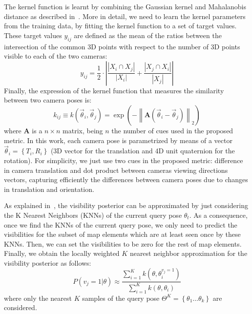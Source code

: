 \documentclass[conference]{IEEEtran}
\begin{document}
The kernel function is learnt by combining the Gaussian kernel and Mahalanobis distance as described in~\cite{Alcantarilla11icra}. More in detail, we need to learn the kernel parameters from the training data, by fitting the kernel function to a set of target values. These target values $y_{ij}$ are defined as the mean of the ratios between the intersection of the common 3D points with respect to the number of 3D points visible to each of the two cameras:
%
\begin{equation}\label{eq:similarity_weighted}
y_{ij} = \frac{1}{2}\cdot \left| \frac{\left|X_i \cap X_j \right|}{\left|X_i\right|} + \frac{\left|X_j \cap X_i\right|}{\left|X_j\right|} \right|
\end{equation}
%
Finally, the expression of the kernel function that measures the similarity between two camera poses is:
%
\begin{equation}\label{eq:visibility_metric}
 k_{ij} \equiv k(\vec{\theta}_i,\vec{\theta}_j) =\exp\left(-\left\| \mathbf{A}(\vec{\theta}_i-\vec{\theta}_j)\right\|_{2}\right)
\end{equation}
%
where $\mathbf{A}$ is a $n \times n$ matrix, being $n$ the number of cues used in the proposed metric. In this work, each camera pose is parametrized by means of a vector $\vec{\theta}_i = \left\{T_{i},R_{i}\right\}$ (3D vector for the translation and 4D unit quaternion for the rotation). For simplicity, we just use two cues in the proposed metric: difference in camera translation and dot product between cameras viewing directions vectors, capturing efficiently the differences between camera poses due to changes in translation and orientation.

As explained in~\cite{Alcantarilla11icra}, the visibility posterior can be approximated by just considering the K Nearest Neighbors (KNNs) of the current query pose $\theta_{t}$. As a consequence, once we find the KNNs of the current query pose, we only need to predict the visibilities for the subset of map elements which are at least seen once by these KNNs. Then, we can set the visibilities to be zero for the rest of map elements. Finally, we obtain the locally weighted $K$ nearest neighbor approximation for the visibility posterior as follows:
%
\begin{equation} \label{eq:KNNVisibility}
P(v_{j}=1|\theta) \approx \frac{\sum\limits_{i=1}^{K}k(\theta,\theta_{i}^{v_{j}=1})}{\sum\limits_{i=1}^{K}k(\theta,\theta_{i})}
\end{equation}
%
where only the nearest $K$ samples of the query pose $\Theta^{K}=\left\{\theta_{1} \ldots \theta_{k}\right\}$ are considered. 
\end{document}
